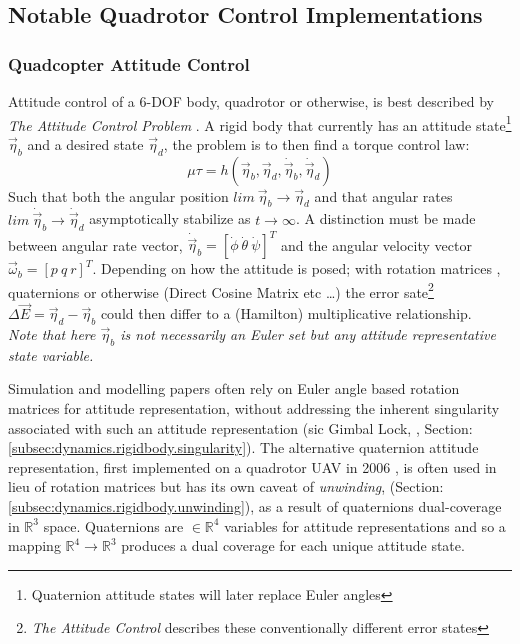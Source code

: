 \subsection{Notable Quadrotor Control Implementations}
\label{subsec:intro.lit.control}
\subsubsection*{Quadcopter Attitude Control}
Attitude control of a 6-DOF body, quadrotor or otherwise, is best described by \emph{The Attitude Control Problem} \cite{attitudecontrolproblem}. A rigid body that currently has an attitude state\footnote{Quaternion attitude states will later replace Euler angles} $\vec{\eta}_b$ and a desired state $\vec{\eta}_d$, the problem is to then find a torque control law:
\begin{equation} \label{eq:2}
\mu\tau = h(\vec{\eta}_b,\vec{\eta}_d,\dot{\vec{\eta}}_b,\dot{\vec{\eta}}_d)
\end{equation}
Such that both the angular position $lim~\vec{\eta}_b \rightarrow \vec{\eta}_d$ and that angular rates $lim~\dot{\vec{\eta}}_b \rightarrow \dot{\vec{\eta}}_d$ asymptotically stabilize as $t \rightarrow \infty$. A distinction must be made between angular rate vector, $\dot{\vec{\eta}}_b=[\dot{\phi}~\dot{\theta}~\dot{\psi}]^T$ and the angular velocity vector $\vec{\omega}_b=[p~q~r]^T$. Depending on how the attitude is posed; with rotation matrices \cite{rigidbodylecture,eulerrigidbody,rotationsequences}, quaternions \cite{quaterniondynamics, rotationsequences, spacecraftattitutdequaternions,fullquaternion} or otherwise (Direct Cosine Matrix etc \ldots) the error sate\footnote{\emph{The Attitude Control} \cite{attitudecontrolproblem} describes these conventionally different error states} $\Delta\vec{E}= \vec{\eta}_d - \vec{\eta}_b$ could then differ to a (Hamilton) multiplicative relationship.
\\
\emph{\color{Gray}Note that here $\vec{\eta}_b$ is not necessarily an Euler set but any attitude representative state variable.}
\par
Simulation and modelling papers often rely on Euler angle based rotation matrices for attitude representation, \cite{adaptivedisturbancecontrol, optimizedpidquadcopter, singleaxistilting, backsteppingquadcoptercontrol, fullquadcoptercontrol} without addressing the inherent singularity associated with such an attitude representation (sic Gimbal Lock, \cite{euleranglesingularity}, Section:\ref{subsec:dynamics.rigidbody.singularity}). The alternative quaternion attitude representation, first implemented on a quadrotor UAV in 2006 \cite{attitudestabilization}, is often used in lieu of rotation matrices but has its own caveat of \emph{unwinding}, (Section:\ref{subsec:dynamics.rigidbody.unwinding}), as a result of quaternions dual-coverage \cite{unwinding} in $\mathbb{R}^3$ space. Quaternions are $\in\mathbb{R}^4$ variables for attitude representations and so a mapping $\mathbb{R}^4\rightarrow\mathbb{R}^3$ produces a dual coverage for each unique attitude state.
